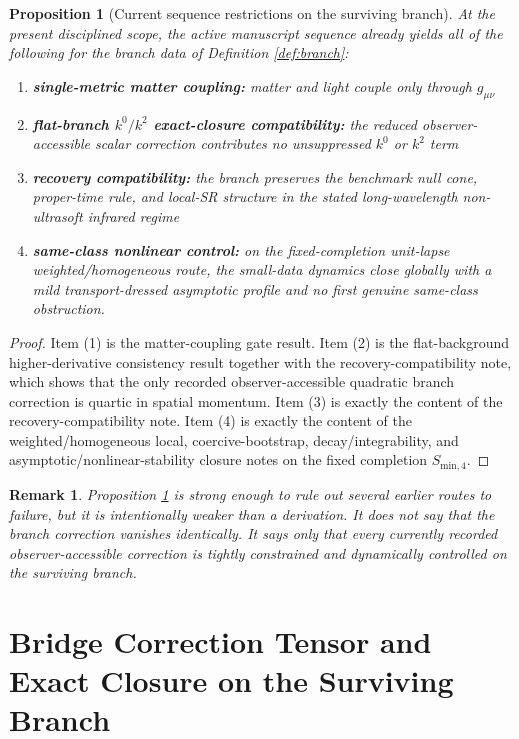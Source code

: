 \documentclass[11pt]{article}
\newtheorem{proposition}{Proposition}
\newtheorem{remark}{Remark}
\begin{document}
\begin{proposition}[Current sequence restrictions on the surviving branch]
\label{prop:restrictions}
At the present disciplined scope, the active manuscript sequence already yields all of the following for the branch data of Definition \ref{def:branch}:
\begin{enumerate}
    \item \textbf{single-metric matter coupling:} matter and light couple only through \(g_{\mu\nu}\)
    \item \textbf{flat-branch \(k^0/k^2\) exact-closure compatibility:} the reduced observer-accessible scalar correction contributes no unsuppressed \(k^0\) or \(k^2\) term
    \item \textbf{recovery compatibility:} the branch preserves the benchmark null cone, proper-time rule, and local-SR structure in the stated long-wavelength non-ultrasoft infrared regime
    \item \textbf{same-class nonlinear control:} on the fixed-completion unit-lapse weighted/homogeneous route, the small-data dynamics close globally with a mild transport-dressed asymptotic profile and no first genuine same-class obstruction.
\end{enumerate}
\end{proposition}

\begin{proof}
Item (1) is the matter-coupling gate result. Item (2) is the flat-background higher-derivative consistency result together with the recovery-compatibility note, which shows that the only recorded observer-accessible quadratic branch correction is quartic in spatial momentum. Item (3) is exactly the content of the recovery-compatibility note. Item (4) is exactly the content of the weighted/homogeneous local, coercive-bootstrap, decay/integrability, and asymptotic/nonlinear-stability closure notes on the fixed completion \(S_{\mathrm{min},4}\).
\end{proof}

\begin{remark}
Proposition \ref{prop:restrictions} is strong enough to rule out several earlier routes to failure, but it is intentionally weaker than a derivation. It does not say that the branch correction vanishes identically. It says only that every currently recorded observer-accessible correction is tightly constrained and dynamically controlled on the surviving branch.
\end{remark}

\section{Bridge Correction Tensor and Exact Closure on the Surviving Branch}
\end{document}
